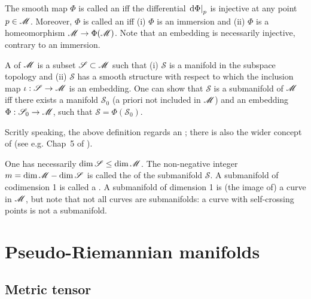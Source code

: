 The smooth map $\Phi$ is called an  iff
the differential $\left.\mathrm{d}\Phi \right| _p$ is injective at any point $p\in\mathscr{M}$.
Moreover, $\Phi$ is called an  iff (i) $\Phi$
is an immersion and (ii) $\Phi$ is a homeomorphism $\mathscr{M} \rightarrow \Phi(\mathscr{M})$.
Note that an embedding is necessarily injective, contrary to an immersion.

A  of $\mathscr{M}$ is a subset $\mathscr{S}\subset \mathscr{M}$ such
that (i) $\mathscr{S}$ is a manifold in the subspace topology and (ii)
$\mathscr{S}$ has a smooth structure with respect to which
the inclusion map $\iota: \mathscr{S} \rightarrow \mathscr{M}$ is an embedding.
One can show that $\mathscr{S}$ is a submanifold of $\mathscr{M}$ iff there exists
a manifold $\mathscr{S}_0$ (a priori not included in $\mathscr{M}$) and an
embedding $\Phi: \mathscr{S}_0 \rightarrow \mathscr{M}$, such that
$\mathscr{S} = \Phi(\mathscr{S}_0)$.

\begin{remark}
Scritly speaking, the above definition regards an
;
there is also the wider concept of  (see e.g. Chap~5 of \cite{Lee13}).
\end{remark}


One has necessarily $\dim \mathscr{S} \leq \dim \mathscr{M}$. The non-negative integer
$m = \dim\mathscr{M} - \dim\mathscr{S}$ is called the 
of the submanifold $\mathscr{S}$. A submanifold of codimension 1 is called
a . A submanifold of dimension 1 is
(the image of) a curve in $\mathscr{M}$, but note that not all curves are submanifolds:
a curve with self-crossing points is not a submanifold.






\section{Pseudo-Riemannian manifolds} \label{s:bas:pRiemManif}

\subsection{Metric tensor} \label{s:bas:metric}

